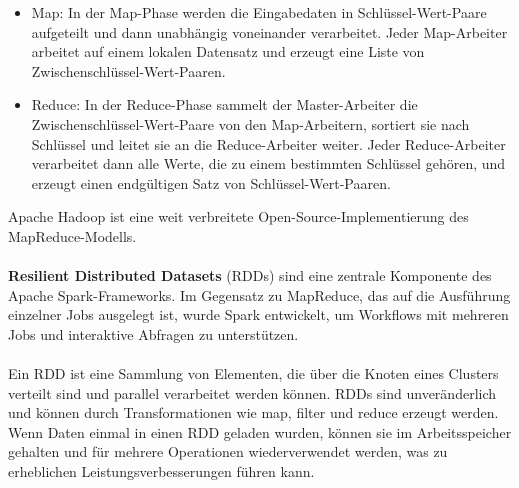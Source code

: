 \begin{itemize}
\item Map: In der Map-Phase werden die Eingabedaten in Schlüssel-Wert-Paare aufgeteilt und dann unabhängig voneinander verarbeitet. Jeder Map-Arbeiter arbeitet auf einem lokalen Datensatz und erzeugt eine Liste von Zwischenschlüssel-Wert-Paaren.
\item Reduce: In der Reduce-Phase sammelt der Master-Arbeiter die Zwischenschlüssel-Wert-Paare von den Map-Arbeitern, sortiert sie nach Schlüssel und leitet sie an die Reduce-Arbeiter weiter. Jeder Reduce-Arbeiter verarbeitet dann alle Werte, die zu einem bestimmten Schlüssel gehören, und erzeugt einen endgültigen Satz von Schlüssel-Wert-Paaren. 
\end{itemize}
Apache Hadoop ist eine weit verbreitete Open-Source-Implementierung des MapReduce-Modells. 
\\\\
\textbf{Resilient Distributed Datasets} (RDDs) sind eine zentrale Komponente des Apache Spark-Frameworks. Im Gegensatz zu MapReduce, das auf die Ausführung einzelner Jobs ausgelegt ist, wurde Spark entwickelt, um Workflows mit mehreren Jobs und interaktive Abfragen zu unterstützen.
\\\\
Ein RDD ist eine Sammlung von Elementen, die über die Knoten eines Clusters verteilt sind und parallel verarbeitet werden können. RDDs sind unveränderlich und können durch Transformationen wie map, filter und reduce erzeugt werden. Wenn Daten einmal in einen RDD geladen wurden, können sie im Arbeitsspeicher gehalten und für mehrere Operationen wiederverwendet werden, was zu erheblichen Leistungsverbesserungen führen kann.

